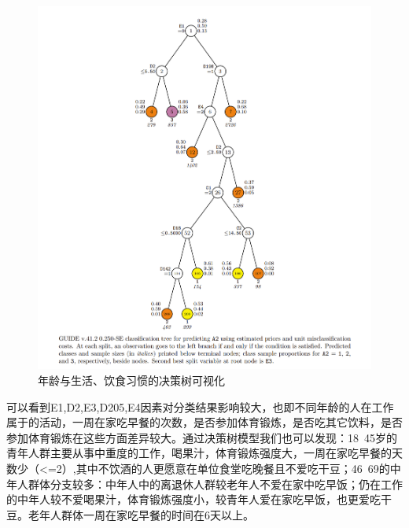 \documentclass{article}
\begin{document}
\begin{CJK}{UTF8}{gbsn}
\begin{figure}[htbp]
    \includegraphics[scale=0.6]{A2_tree.png}
    \caption{年龄与生活、饮食习惯的决策树可视化}
    \label{}
\end{figure}
可以看到E1,D2,E3,D205,E4因素对分类结果影响较大，也即不同年龄的人在工作属于的活动，一周在家吃早餐的次数，是否参加体育锻炼，是否吃其它饮料，是否参加体育锻炼在这些方面差异较大。通过决策树模型我们也可以发现：18~45岁的青年人群主要从事中重度的工作，喝果汁，体育锻炼强度大，一周在家吃早餐的天数少（<=2）,其中不饮酒的人更愿意在单位食堂吃晚餐且不爱吃干豆；46~69的中年人群体分支较多：中年人中的离退休人群较老年人不爱在家中吃早饭；仍在工作的中年人较不爱喝果汁，体育锻炼强度小，较青年人爱在家吃早饭，也更爱吃干豆。老年人群体一周在家吃早餐的时间在6天以上。\\


\end{CJK}
\end{document}
